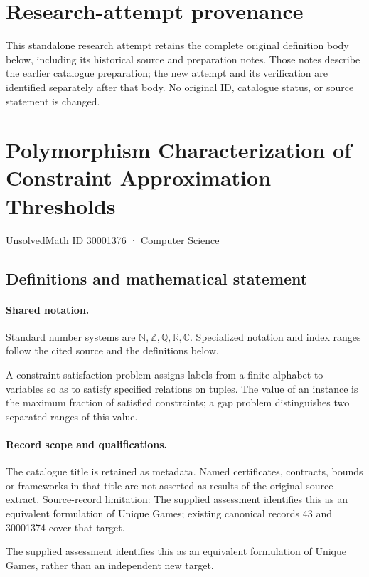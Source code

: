 \documentclass[11pt]{article}
\begin{document}
\section*{Research-attempt provenance}
This standalone research attempt retains the complete original definition body below,
including its historical source and preparation notes. Those notes describe the
earlier catalogue preparation; the new attempt and its verification are identified
separately after that body. No original ID, catalogue status, or source statement is changed.

\section{Polymorphism Characterization of Constraint Approximation Thresholds}\label{30001376}
{\small UnsolvedMath ID 30001376 · Computer Science}
\subsection{Definitions and mathematical statement}

\paragraph{Shared notation.}Standard number systems are $\mathbb N,\mathbb Z,\mathbb Q,\mathbb R,\mathbb C$. Specialized notation and index ranges follow the cited source and the definitions below.


A constraint satisfaction problem assigns labels from a finite alphabet to variables so as to satisfy specified relations on tuples. The value of an instance is the maximum fraction of satisfied constraints; a gap problem distinguishes two separated ranges of this value.
\paragraph{Record scope and qualifications.}
The catalogue title is retained as metadata. Named certificates, contracts, bounds or frameworks in that title are not asserted as results of the original source extract.
Source-record limitation: The supplied assessment identifies this as an equivalent formulation of Unique Games; existing canonical records 43 and 30001374 cover that target.

The supplied assessment identifies this as an equivalent formulation of Unique Games, rather than an independent new target.
\end{document}
